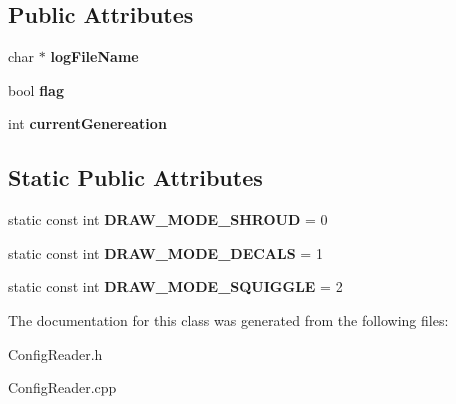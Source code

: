 \subsection*{Public Attributes}
\begin{DoxyCompactItemize}
\item 
\hypertarget{class_config_reader_adff3f922c1af68d2ff3ffb2935f9ff7b}{char $\ast$ {\bfseries log\-File\-Name}}\label{class_config_reader_adff3f922c1af68d2ff3ffb2935f9ff7b}

\item 
\hypertarget{class_config_reader_abab3606d626f5ae659ffd34a6ecab8c2}{bool {\bfseries flag}}\label{class_config_reader_abab3606d626f5ae659ffd34a6ecab8c2}

\item 
\hypertarget{class_config_reader_a1ab9194bdcf3d05cddc5ddcfe99dc08f}{int {\bfseries current\-Genereation}}\label{class_config_reader_a1ab9194bdcf3d05cddc5ddcfe99dc08f}

\end{DoxyCompactItemize}
\subsection*{Static Public Attributes}
\begin{DoxyCompactItemize}
\item 
\hypertarget{class_config_reader_a728af86620d2f7bd22f8f50dc576dfbc}{static const int {\bfseries D\-R\-A\-W\-\_\-\-M\-O\-D\-E\-\_\-\-S\-H\-R\-O\-U\-D} = 0}\label{class_config_reader_a728af86620d2f7bd22f8f50dc576dfbc}

\item 
\hypertarget{class_config_reader_af7fb8fa1f2cc76913afc78a2726e44a6}{static const int {\bfseries D\-R\-A\-W\-\_\-\-M\-O\-D\-E\-\_\-\-D\-E\-C\-A\-L\-S} = 1}\label{class_config_reader_af7fb8fa1f2cc76913afc78a2726e44a6}

\item 
\hypertarget{class_config_reader_a51777b70066b67ddb71b1f2a0762e20a}{static const int {\bfseries D\-R\-A\-W\-\_\-\-M\-O\-D\-E\-\_\-\-S\-Q\-U\-I\-G\-G\-L\-E} = 2}\label{class_config_reader_a51777b70066b67ddb71b1f2a0762e20a}

\end{DoxyCompactItemize}


The documentation for this class was generated from the following files\-:\begin{DoxyCompactItemize}
\item 
Config\-Reader.\-h\item 
Config\-Reader.\-cpp\end{DoxyCompactItemize}
